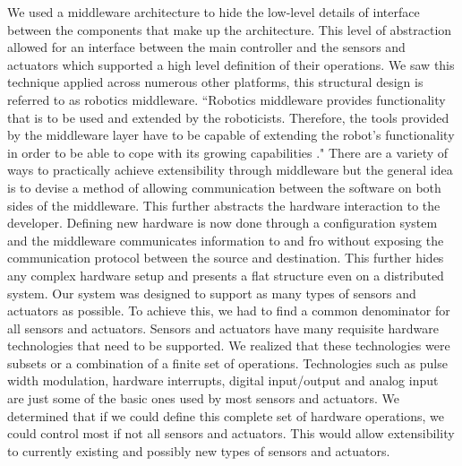We used a middleware architecture to hide the low-level details of interface between the components that make up the \xten architecture. This level of abstraction allowed for an interface between the main controller and the sensors and actuators which supported a high level definition of their operations. We saw this technique applied across numerous other platforms, this structural design is referred to as robotics middleware. ``Robotics middleware provides functionality that is to be used and extended by the roboticists. Therefore, the tools provided by the middleware layer have to be capable of extending the robot's functionality in order to be able to cope with its growing capabilities \cite{advanced}." There are a variety of ways to practically achieve extensibility through middleware but the general idea is to devise a method of allowing communication between the software on both sides of the middleware. This further abstracts the hardware interaction to the developer. Defining new hardware is now done through a configuration system and the middleware communicates information to and fro without exposing the communication protocol between the source and destination. This further hides any complex hardware setup and presents a flat structure even on a distributed system.
Our system was designed to support as many types of sensors and actuators as possible. To achieve this, we had to find a common denominator for all sensors and actuators. Sensors and actuators have many requisite hardware technologies that need to be supported. We realized that these technologies were subsets or a combination of a finite set of operations. Technologies such as pulse width modulation, hardware interrupts, digital input/output and analog input are just some of the basic ones used by most sensors and actuators. We determined that if we could define this complete set of hardware operations, we could control most if not all sensors and actuators. This would allow extensibility to currently existing and possibly new types of sensors and actuators.




